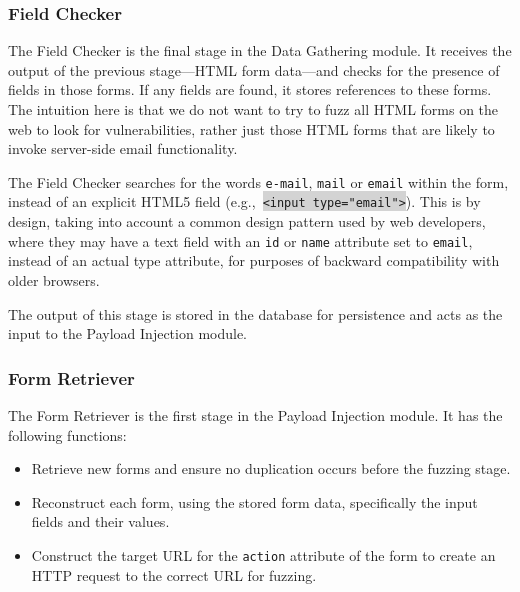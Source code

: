 \subsubsection{\Email Field Checker}
\label{Comp:EMFC}
The \Email Field Checker is the final stage in the Data Gathering module. It receives the output of the previous stage---HTML form data---and checks for the presence of \email fields in those forms. If any \email fields are found, it stores references to these forms.
The intuition here is that we do not want to try to fuzz all HTML forms on the web to look for \ehi vulnerabilities, rather just those HTML forms that are likely to invoke server-side email functionality.

The \Email Field Checker searches for the words \texttt{e-mail}, \texttt{mail} or \texttt{email} within the form, instead of an explicit HTML5 \email field (e.g.,\ \colorbox{lightgray}{\lstinline{<input type="email">}}). This is by design, taking into account a common design pattern used by web developers, where they may have a text field with an \texttt{id} or \texttt{name} attribute set to \texttt{email}, instead of an actual \email type attribute, for purposes of backward compatibility with older browsers.


The output of this stage is stored in the database for persistence and acts as the input to the Payload Injection module.

\subsubsection{\Email Form Retriever}
\label{Comp:EMFR}
The \Email Form Retriever is the first stage in the Payload Injection module. It has the following functions:
\begin{itemize}
	\item Retrieve new forms and ensure no duplication occurs before the fuzzing stage.
	\item Reconstruct each form, using the stored form data, specifically the input fields and their values.
	\item Construct the target URL for the \texttt{action} attribute of the form to create an HTTP request to the correct URL for fuzzing. 
\end{itemize}

